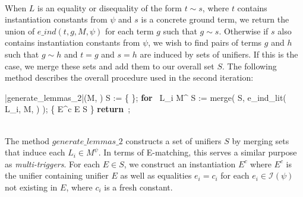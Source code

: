 \documentclass{llncs}
\newtheorem{thm}{Theorem}
\def\RETURN{\keyword{return}\ }
\def\ENDPROC{\untab}
\def\DOFOR{\qtab\keyword{for}\ }
\def\ENDFOR{\untab}
\def\keyword#1{\mbox{\normalshape\bf #1}}
\begin{document}
\ \\

When $L$ is an equality or disequality of the form $t \sim s$, where $t$ contains instantiation constants from $\psi$ and $s$ is a concrete ground term, we return the union of $e\_ind( t, g, M, \psi )$ for each term $g$ such that $g \sim s$.
Otherwise if $s$ also contains instantiation constants from $\psi$, we wish to find pairs of terms $g$ and $h$ such that $g \sim h$ and $t = g$ and $s = h$ are induced by sets of unifiers.
If this is the case, we merge these sets and add them to our overall set $S$.
The following method describes the overall procedure used in the second iteration:

\begin{minipage}[t]{.4\linewidth}
\begin{program}
\PROC |generate\_lemmas\_2|(M, \psi) \BODY
  S := \{ \emptyset \};
  \DOFOR {} L_i \in M^\psi
    S := merge( S, e\_ind\_lit( L_i, M, \psi ) );
  \ENDFOR
   \{ E^c \mid E \in S \}
  \RETURN;
\ENDPROC
\end{program}
\end{minipage}

\ \\

The method $generate\_lemmas\_2$ constructs a set of unifiers $S$ by merging sets that induce each $L_i \in M^\psi$.
In terms of E-matching, this serves a similar purpose as \emph{multi-triggers}.
For each $E \in S$, we construct an instantiation $E^c$ where $E^c$ is the unifier containing unifier $E$ as well as equalities $e_i = c_i$ for each $e_i \in \mathcal{I}( \psi )$ not existing in $E$, where $c_i$ is a fresh constant.

\begin{comment}
\begin{thm}
\label{thm:eind-ready}
Given a candidate-satisifiable DPLL(T) state $M \parallel F$, and a formula $\psi$ of the form $\forall \bar{x}. \varphi[ \bar{x} ]$ that is counterexample-active in $M \parallel F$ for $\bar{e}.
For all unifiers $\bar{e} = \bar{s}$ returned by the function $generate\_inst\_2$, we have that $\psi$ is $\bar{e}-\bar{s}$-induced in $M$.
\end{thm}
\begin{proof}
We must show $M \backslash M^\psi, \bar{e} = \bar{s} \models M^\psi$.

\end{proof}
Theorem~\ref{thm:eind-ready} states that if all instantiation literals for $\psi$ are induced by the same equality set $E$, then the corresponding instantiation $E^c$ is guarenteed to lead to a conflict.
\end{comment}
\end{document}
